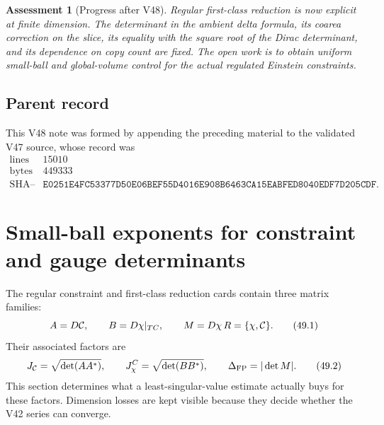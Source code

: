 \documentclass[11pt]{article}
\newtheorem{assessment}[theorem]{Assessment}
\begin{document}
\begin{assessment}[Progress after V48]
\label{ass:v11v48-status}
Regular first-class reduction is now explicit at finite dimension.
The determinant in the ambient delta formula, its coarea correction on
the slice, its equality with the square root of the Dirac determinant,
and its dependence on copy count are fixed.  The open work is to obtain
uniform small-ball and global-volume control for the actual regulated
Einstein constraints.
\end{assessment}

\subsection{Parent record}

This V48 note was formed by appending the preceding material to the
validated V47 source, whose record was
\[
\begin{array}{c|c}
\text{lines}&15010\\
\text{bytes}&449333\\
\text{SHA--256}&
\texttt{E0251E4FC53377D50E06BEF55D4016E908B6463CA15EABFED8040EDF7D205CDF}.
\end{array}                                                     \tag{48.21}
\]



\section{Small-ball exponents for constraint and gauge determinants}
\label{sec:v11v49}

The regular constraint and first-class reduction cards contain three
matrix families:
\[
 A=D{\cal C},\qquad B=D\chi|_{T C},\qquad
 M=D\chi\,R=\{\chi,{\cal C}\}.                                \tag{49.1}
\]
Their associated factors are
\[
 J_{\cal C}=\sqrt{\det(AA^*)},\qquad
 J_\chi^C=\sqrt{\det(BB^*)},\qquad
 \Delta_{\rm FP}=|\det M|.                                   \tag{49.2}
\]
This section determines what a least-singular-value estimate actually
buys for these factors.  Dimension losses are kept visible because
they decide whether the V42 series can converge.
\end{document}
